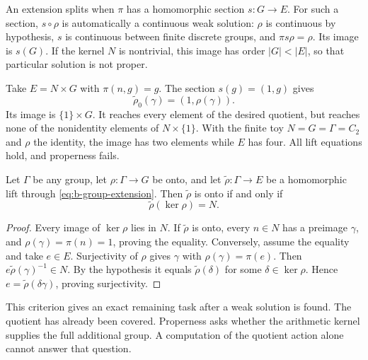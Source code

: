An extension splits when \(\pi\) has a homomorphic section \(s:G\to E\). For such a section, \(s\circ\rho\) is automatically a continuous weak solution: \(\rho\) is continuous by hypothesis, \(s\) is continuous between finite discrete groups, and \(\pi s\rho=\rho\). Its image is \(s(G)\). If the kernel \(N\) is nontrivial, this image has order \(|G|<|E|\), so that particular solution is not proper.

\begin{example}
\label{ex:b-split-weak}
Take \(E=N\times G\) with \(\pi(n,g)=g\). The section \(s(g)=(1,g)\) gives
\[
 \widetilde\rho_0(\gamma)=(1,\rho(\gamma)).
\]
Its image is \(\{1\}\times G\). It reaches every element of the desired quotient, but reaches none of the nonidentity elements of \(N\times\{1\}\). With the finite toy \(N=G=\Gamma=C_2\) and \(\rho\) the identity, the image has two elements while \(E\) has four. All lift equations hold, and properness fails.
\end{example}

\begin{proposition}
\label{prop:b-kernel-coverage}
Let \(\Gamma\) be any group, let \(\rho:\Gamma\to G\) be onto, and let \(\widetilde\rho:\Gamma\to E\) be a homomorphic lift through \eqref{eq:b-group-extension}. Then \(\widetilde\rho\) is onto if and only if
\begin{equation}
 \widetilde\rho(\ker\rho)=N.
 \label{eq:b-kernel-coverage}
\end{equation}
\end{proposition}

\begin{proof}
Every image of \(\ker\rho\) lies in \(N\). If \(\widetilde\rho\) is onto, every \(n\in N\) has a preimage \(\gamma\), and \(\rho(\gamma)=\pi(n)=1\), proving the equality. Conversely, assume the equality and take \(e\in E\). Surjectivity of \(\rho\) gives \(\gamma\) with \(\rho(\gamma)=\pi(e)\). Then \(e\widetilde\rho(\gamma)^{-1}\in N\). By the hypothesis it equals \(\widetilde\rho(\delta)\) for some \(\delta\in\ker\rho\). Hence \(e=\widetilde\rho(\delta\gamma)\), proving surjectivity.
\end{proof}

This criterion gives an exact remaining task after a weak solution is found. The quotient has already been covered. Properness asks whether the arithmetic kernel supplies the full additional group. A computation of the quotient action alone cannot answer that question.


